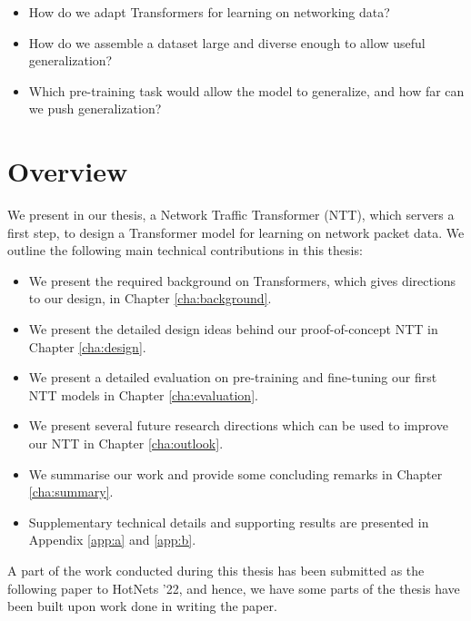 \begin{itemize}
    \item
          How do we adapt Transformers for learning on networking data?
    \item
          How do we assemble a dataset large and diverse enough to allow useful generalization?
    \item
          Which pre-training task would allow the model to generalize, and how far can we push generalization?
\end{itemize}

\section{Overview}
\label{sec:overview}

We present in our thesis, a Network Traffic Transformer (NTT), which servers a first step, to design a Transformer model for learning on network packet data. We outline the following main technical contributions in this thesis:

\begin{itemize}
\item We present the required background on Transformers, which gives directions to our design, in Chapter \ref{cha:background}.
\item We present the detailed design ideas behind our proof-of-concept NTT in Chapter \ref{cha:design}.
\item We present a detailed evaluation on pre-training and fine-tuning our first NTT models in Chapter \ref{cha:evaluation}.
\item We present several future research directions which can be used to improve our NTT in Chapter \ref{cha:outlook}.
\item We summarise our work and provide some concluding remarks in Chapter \ref{cha:summary}.
\item Supplementary technical details and supporting results are presented in Appendix \ref{app:a} and \ref{app:b}. 
\end{itemize}

A part of the work conducted during this thesis has been submitted as the following paper\cite{newhope} to HotNets '22, and hence, we have some parts of the thesis have been built upon work done in writing the paper.
